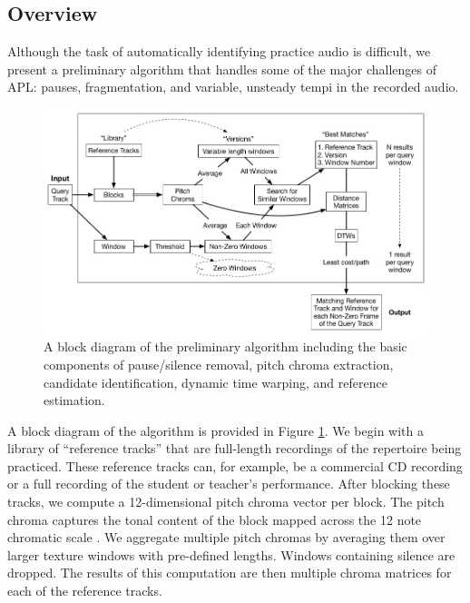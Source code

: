 \documentclass{article}
\begin{document}

\subsection{Overview}
Although the task of automatically identifying practice audio is difficult, we present a preliminary algorithm that handles some of the major challenges of APL: pauses, fragmentation, and variable, unsteady tempi in the recorded audio.

\begin{figure}
\includegraphics[width=\linewidth]{figs/APLSystem2.jpg}
\caption{A block diagram of the preliminary algorithm including the basic components of pause/silence removal, pitch chroma extraction, candidate identification, dynamic time warping, and reference estimation.}
\label{fig:APLSystem}
\end{figure}%


A block diagram of the algorithm is provided in Figure \ref{fig:APLSystem}. We begin with a library of ``reference tracks'' that are full-length recordings of the repertoire being practiced. These reference tracks can, for example, be a commercial CD recording or a full recording of the student or teacher's performance. After blocking these tracks, we compute a 12-dimensional pitch chroma vector per block. The pitch chroma captures the tonal content of the block mapped across the 12 note chromatic scale \cite{bartsch2001catch}. We aggregate multiple pitch chromas by averaging them over larger texture windows with pre-defined lengths. Windows containing silence are dropped. The results of this computation are then multiple chroma matrices for each of the reference tracks.
\end{document}
